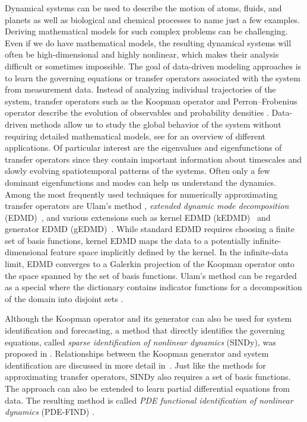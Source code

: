 \documentclass
[
    a4paper,
    DIV=11,
    abstract=true,
    11pt,
]
{scrartcl}
\theoremstyle{definition}
\begin{document}
Dynamical systems can be used to describe the motion of atoms, fluids, and planets as well as biological and chemical processes to name just a few examples. Deriving mathematical models for such complex problems can be challenging. Even if we do have mathematical models, the resulting dynamical systems will often be high-dimensional and highly nonlinear, which makes their analysis difficult or sometimes impossible. The goal of data-driven modeling approaches is to learn the governing equations or transfer operators associated with the system from measurement data. Instead of analyzing individual trajectories of the system, transfer operators such as the Koopman operator and Perron--Frobenius operator describe the evolution of observables and probability densities \cite{LaMa94, DJ99, Mezic05, KKS16}. Data-driven methods allow us to study the global behavior of the system without requiring detailed mathematical models, see \cite{KD24} for an overview of different applications. Of particular interest are the eigenvalues and eigenfunctions of transfer operators since they contain important information about timescales and slowly evolving spatiotemporal patterns of the systems. Often only a few dominant eigenfunctions and modes can help us understand the dynamics. Among the most frequently used techniques for numerically approximating transfer operators are Ulam's method \cite{Ulam60, CU02}, \emph{extended dynamic mode decomposition} (EDMD)~\cite{williams2015data, KKS16}, and various extensions such as kernel EDMD (kEDMD)~\cite{WRK15, KSM20} and generator EDMD (gEDMD)~\cite{KNPNCS20}. While standard EDMD requires choosing a finite set of basis functions, kernel EDMD maps the data to a potentially infinite-dimensional feature space implicitly defined by the kernel. In the infinite-data limit, EDMD converges to a Galerkin projection of the Koopman operator onto the space spanned by the set of basis functions. Ulam's method can be regarded as a special where the dictionary contains indicator functions for a decomposition of the domain into disjoint sets \cite{KKS16}.

Although the Koopman operator and its generator can also be used for system identification and forecasting, a method that directly identifies the governing equations, called \emph{sparse identification of nonlinear dynamics} (SINDy), was proposed in \cite{brunton2016discovering}. Relationships between the Koopman generator and system identification are discussed in more detail in~\cite{MauGon16, KNPNCS20}. Just like the methods for approximating transfer operators, SINDy also requires a set of basis functions. The approach can also be extended to learn partial differential equations from data. The resulting method is called \emph{PDE functional identification of nonlinear dynamics} (PDE-FIND) \cite{rudy2017data}.
\end{document}

